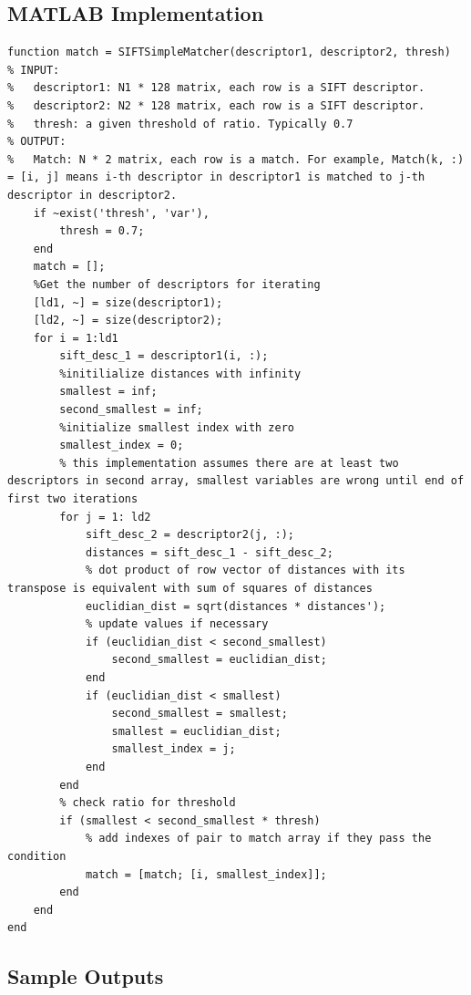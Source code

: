 \documentclass{article}
\begin{document}
\subsection{MATLAB Implementation}

\begin{lstlisting}[caption={My implementation of SIFTSimpleMatcher function.},captionpos=b]
function match = SIFTSimpleMatcher(descriptor1, descriptor2, thresh)
% INPUT:
%   descriptor1: N1 * 128 matrix, each row is a SIFT descriptor.
%   descriptor2: N2 * 128 matrix, each row is a SIFT descriptor.
%   thresh: a given threshold of ratio. Typically 0.7
% OUTPUT:
%   Match: N * 2 matrix, each row is a match. For example, Match(k, :) = [i, j] means i-th descriptor in descriptor1 is matched to j-th descriptor in descriptor2.
    if ~exist('thresh', 'var'),
        thresh = 0.7;
    end
    match = [];
    %Get the number of descriptors for iterating
    [ld1, ~] = size(descriptor1);
    [ld2, ~] = size(descriptor2);
    for i = 1:ld1
        sift_desc_1 = descriptor1(i, :);
        %initilialize distances with infinity
        smallest = inf;
        second_smallest = inf;
        %initialize smallest index with zero
        smallest_index = 0;
        % this implementation assumes there are at least two descriptors in second array, smallest variables are wrong until end of first two iterations
        for j = 1: ld2
            sift_desc_2 = descriptor2(j, :);
            distances = sift_desc_1 - sift_desc_2;
            % dot product of row vector of distances with its transpose is equivalent with sum of squares of distances
            euclidian_dist = sqrt(distances * distances');
            % update values if necessary
            if (euclidian_dist < second_smallest)
                second_smallest = euclidian_dist;
            end
            if (euclidian_dist < smallest)
                second_smallest = smallest;
                smallest = euclidian_dist;
                smallest_index = j;
            end
        end
        % check ratio for threshold
        if (smallest < second_smallest * thresh)
            % add indexes of pair to match array if they pass the condition
            match = [match; [i, smallest_index]];
        end
    end
end

\end{lstlisting}
\subsection{Sample Outputs}
\end{document}
